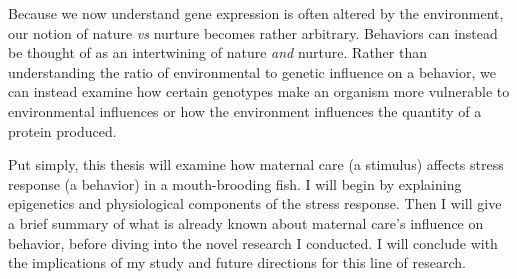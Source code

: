 \documentclass[12pt,twoside]{reedthesis}
\begin{document}
Because we now understand gene expression is often altered by the environment, our notion of
nature \textit{vs} nurture becomes rather arbitrary. Behaviors can instead be
thought of as an intertwining of nature \textit{and} nurture. Rather than
understanding the ratio of environmental to genetic influence on a behavior, we
can instead examine how certain genotypes make an organism more vulnerable to
environmental influences or how the environment influences the quantity of a
protein produced. 

Put simply, this thesis will examine how maternal care (a stimulus) affects
stress response (a behavior) in a mouth-brooding fish. I will begin by
explaining epigenetics and physiological components of the stress response. Then
I will give a brief summary of what is already known about maternal care's
influence on behavior, before diving into the novel research I conducted. I will
conclude with the implications of my study and future directions for this
line of research.






\end{document}
